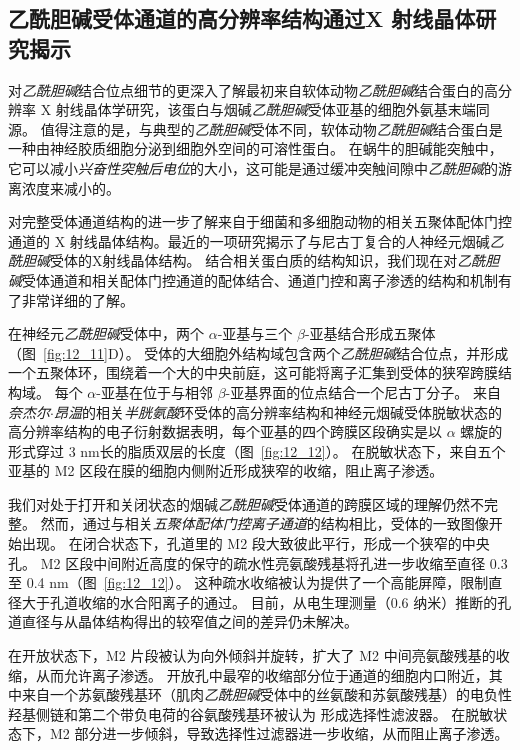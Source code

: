 \subsection{乙酰胆碱受体通道的高分辨率结构通过X 射线晶体研究揭示}

对\textit{乙酰胆碱}结合位点细节的更深入了解最初来自软体动物\textit{乙酰胆碱}结合蛋白的高分辨率 X 射线晶体学研究，该蛋白与烟碱\textit{乙酰胆碱}受体亚基的细胞外氨基末端同源。
值得注意的是，与典型的\textit{乙酰胆碱}受体不同，软体动物\textit{乙酰胆碱}结合蛋白是一种由神经胶质细胞分泌到细胞外空间的可溶性蛋白。
在蜗牛的胆碱能突触中，它可以减小\textit{兴奋性突触后电位}的大小，这可能是通过缓冲突触间隙中\textit{乙酰胆碱}的游离浓度来减小的。


对完整受体通道结构的进一步了解来自于细菌和多细胞动物的相关五聚体配体门控通道的 X 射线晶体结构。最近的一项研究揭示了与尼古丁复合的人神经元烟碱\textit{乙酰胆碱}受体的X射线晶体结构。
结合相关蛋白质的结构知识，我们现在对\textit{乙酰胆碱}受体通道和相关配体门控通道的配体结合、通道门控和离子渗透的结构和机制有了非常详细的了解。


在神经元\textit{乙酰胆碱}受体中，两个 $\alpha$-亚基与三个 $\beta$-亚基结合形成五聚体（图~\ref{fig:12_11}D）。
受体的大细胞外结构域包含两个\textit{乙酰胆碱}结合位点，并形成一个五聚体环，围绕着一个大的中央前庭，这可能将离子汇集到受体的狭窄跨膜结构域。
每个 $\alpha$-亚基在位于与相邻 $\beta$-亚基界面的位点结合一个尼古丁分子。
来自\textit{奈杰尔$\cdot$昂温}的相关\textit{半胱氨酸}环受体的高分辨率结构和神经元烟碱受体脱敏状态的高分辨率结构的电子衍射数据表明，每个亚基的四个跨膜区段确实是以 $\alpha$ 螺旋的形式穿过 3 nm长的脂质双层的长度（图~\ref{fig:12_12}）。
在脱敏状态下，来自五个亚基的 M2 区段在膜的细胞内侧附近形成狭窄的收缩，阻止离子渗透。


我们对处于打开和关闭状态的烟碱\textit{乙酰胆碱}受体通道的跨膜区域的理解仍然不完整。
然而，通过与相关\textit{五聚体配体门控离子通道}的结构相比，受体的一致图像开始出现。
在闭合状态下，孔道里的 M2 段大致彼此平行，形成一个狭窄的中央孔。
M2 区段中间附近高度的保守的疏水性亮氨酸残基将孔进一步收缩至直径 0.3 至 0.4 nm（图~\ref{fig:12_12}）。
这种疏水收缩被认为提供了一个高能屏障，限制直径大于孔道收缩的水合阳离子的通过。
目前，从电生理测量（0.6 纳米）推断的孔道直径与从晶体结构得出的较窄值之间的差异仍未解决。


在开放状态下，M2 片段被认为向外倾斜并旋转，扩大了 M2 中间亮氨酸残基的收缩，从而允许离子渗透。
开放孔中最窄的收缩部分位于通道的细胞内口附近，其中来自一个苏氨酸残基环（肌肉\textit{乙酰胆碱}受体中的丝氨酸和苏氨酸残基）的电负性羟基侧链和第二个带负电荷的谷氨酸残基环被认为 形成选择性滤波器。
在脱敏状态下，M2 部分进一步倾斜，导致选择性过滤器进一步收缩，从而阻止离子渗透。


